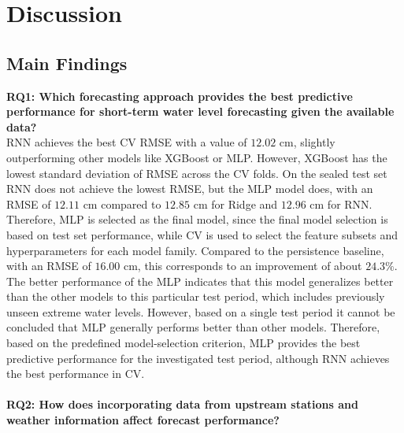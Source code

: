 \chapter{Discussion}



\section{Main Findings}
\textbf{\ac{RQ}1: Which forecasting approach provides the best predictive performance for short-term water level forecasting given the available data?}\\
\ac{RNN} achieves the best \ac{CV} \ac{RMSE} with a value of $12.02$ cm, slightly outperforming other models like XGBoost or \ac{MLP}. However, XGBoost has the lowest standard deviation of \ac{RMSE} across the \ac{CV} folds. On the sealed test set \ac{RNN} does not achieve the lowest \ac{RMSE}, but the \ac{MLP} model does, with an \ac{RMSE} of $12.11$ cm compared to $12.85$ cm for Ridge and $12.96$ cm for \ac{RNN}. Therefore, \ac{MLP} is selected as the final model, since the final model selection is based on test set performance, while \ac{CV} is used to select the feature subsets and hyperparameters for each model family. Compared to the persistence baseline, with an \ac{RMSE} of $16.00$ cm, this corresponds to an improvement of about $24.3\%$. The better performance of the \ac{MLP} indicates that this model generalizes better than the other models to this particular test period, which includes previously unseen extreme water levels. However, based on a single test period it cannot be concluded that \ac{MLP} generally performs better than other models. Therefore, based on the predefined model-selection criterion, \ac{MLP} provides the best predictive performance for the investigated test period, although \ac{RNN} achieves the best performance in \ac{CV}.
\\ \\
\textbf{\ac{RQ}2: How does incorporating data from upstream stations and weather information affect forecast performance?}\\
